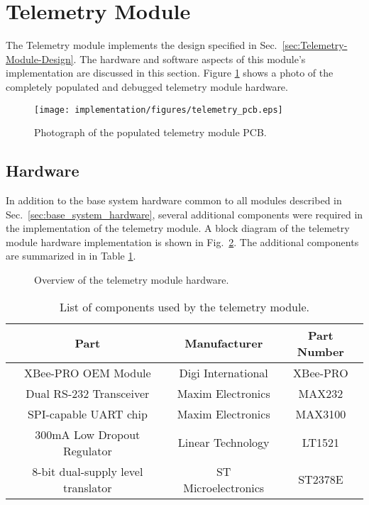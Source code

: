 \section{Telemetry Module}

The Telemetry module implements the design specified in Sec.\ \ref{sec:Telemetry-Module-Design}. The hardware and software aspects of this module's implementation are discussed in this section. Figure \ref{fig:telemetry_pcb} shows a photo of the completely populated and debugged telemetry module hardware.

\begin{figure}[H]
\centering
\texttt{[image: implementation/figures/telemetry\_pcb.eps]}
\caption{Photograph of the populated telemetry module PCB.}
\label{fig:telemetry_pcb}
\end{figure}

\subsection{Hardware}

In addition to the base system hardware common to all modules described in Sec.\ \ref{sec:base_system_hardware}, several additional components were required in the implementation of the telemetry module. A block diagram of the telemetry module hardware implementation is shown in Fig.\ \ref{fig:telemetry_hardware_block}. The additional components are summarized in in Table \ref{tab:telemetry_module_components}.

\begin{figure}[H]
\centering

\caption{Overview of the telemetry module hardware.\label{fig:telemetry_hardware_block}}
\end{figure}

\begin{table}[H]
  \caption{List of components used by the telemetry module.}
  \centering
    \begin{tabular}{|c|c|c|}
      \hline 
      Part & Manufacturer & Part Number\tabularnewline
      \hline
      \hline
      XBee-PRO OEM Module & Digi International & XBee-PRO\tabularnewline
      \hline 
      Dual RS-232 Transceiver & Maxim Electronics & MAX232\tabularnewline
      \hline 
      SPI-capable UART chip & Maxim Electronics & MAX3100\tabularnewline
      \hline 
      300mA Low Dropout Regulator & Linear Technology & LT1521\tabularnewline
      \hline
      8-bit dual-supply level translator & ST Microelectronics & ST2378E\tabularnewline
      \hline
    \end{tabular}
    \label{tab:telemetry_module_components}
\end{table}

